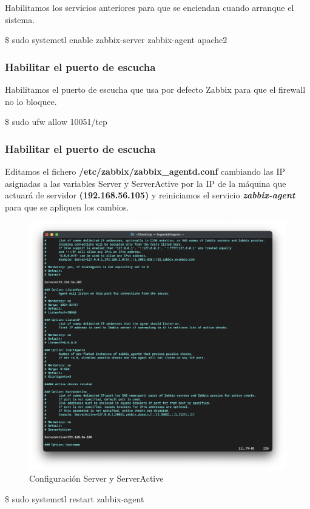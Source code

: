     Habilitamos los servicios anteriores para que se enciendan cuando arranque el sistema.
        \begin{tcolorbox}[colback=black!10, halign=left]
            \$ sudo systemctl enable zabbix-server zabbix-agent apache2
        \end{tcolorbox}

    \subsubsection{Habilitar el puerto de escucha}
    Habilitamos el puerto de escucha que usa por defecto Zabbix para que el firewall no lo bloquee.
        \begin{tcolorbox}[colback=black!10, halign=left]
            \$ sudo ufw allow 10051/tcp
        \end{tcolorbox}

    \subsubsection{Habilitar el puerto de escucha}
    Editamos el fichero \textbf{/etc/zabbix/zabbix\_agentd.conf} cambiando las IP asignadas a las variables Server y ServerActive por la IP de la máquina que actuará de servidor
    \textbf{(192.168.56.105)} y reiniciamos el servicio \textbf{\emph{zabbix-agent}} para que se apliquen los cambios.
        \begin{figure}[H]
            \centering
            \includegraphics[scale=0.45]{images/ubuntu_servers.png}
            \caption{Configuración Server y ServerActive}
            \label{fig:ubuntu_servers}
        \end{figure}
        \begin{tcolorbox}[colback=black!10, halign=left]
            \$ sudo systemctl restart zabbix-agent
        \end{tcolorbox}


